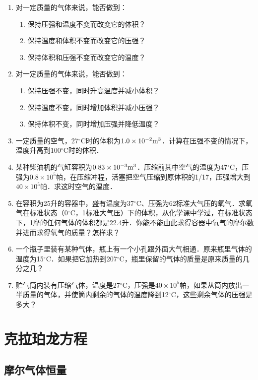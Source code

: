 \begin{enumerate}
	\item 对一定质量的气体来说，能否做到：
	\begin{enumerate}
	\item	保持压强和温度不变而改变它的体积？
	\item	保持温度和体积不变而改变它的压强？
	\item	保持体积和压强不变而改变它的温度？	 
	\end{enumerate}
\item  对一定质量的气体来说，能否做到：
\begin{enumerate}
\item 保持压强不变，同时升高温度并减小体积？
\item 保持温度不变，同时增加体积并减小压强？
\item 保持体积不变，同时增加压强并降低温度？
\end{enumerate}

\item  一定质量的空气，27$^\circ$C时的体积为$1.0\times 10^{-2}{\rm m}^3$．计算在压强不变的情况下，温度升高到100$^\circ$C时的体积．
\item  某种柴油机的气缸容积为$0.83\times 10^{-3}{\rm m^3}$．压缩前其中空气的温度为47$^\circ$C，压强为$0.8\times 10^5$帕，在压缩冲程，活塞把空气压缩到原体积的1/17，压强增大到$40\times 10^5$帕．求这时空气的温度．
\item  在容积为25升的容器中，盛有温度为37$^\circ$C、压强为62标准大气压的氧气．求氧气在标准状态（0$^\circ$C，1标准大气压）下的体积，从化学课中学过，在标准状态下，1摩的任何气体的体积都是22.4升．你能不能由此求得容器中氧气的摩尔数并进而求得氧气的质量？怎样求？
\item  一个瓶子里装有某种气体，瓶上有一个小孔跟外面大气相通．原来瓶里气体的温度为15$^\circ$C．如果把它加热到207$^\circ$C，瓶里保留的气体的质量是原来质量的几分之几？
\item  贮气筒内装有压缩气体，温度是27$^\circ$C，压强是$40\times 10^5$帕，如果从筒内放出一半质量的气体，并使筒内剩余的气体的温度降到12$^\circ$C，这些剩余气体的压强是多大？

\end{enumerate}


\section{克拉珀龙方程}
\subsection{摩尔气体恒量} 

